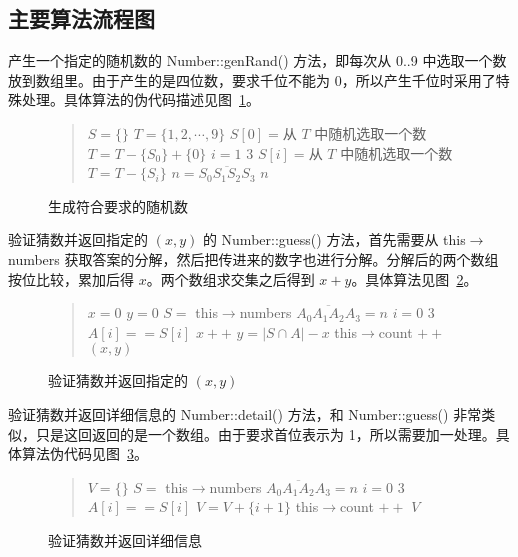 \subsection{主要算法流程图}

产生一个指定的随机数的 Number::genRand() 方法，即每次从 0..9 中选取一个数放到数组里。由于产生的是四位数，要求千位不能为 0，所以产生千位时采用了特殊处理。具体算法的伪代码描述见图~\ref{Number::genRand}。

\begin{figure}[htp]
\begin{quote}
\begin{codebox}
\li $S = \{\}$
\li $T = \{1, 2, \cdots, 9\}$
\li $S[0] = $从 $T$ 中随机选取一个数
\li $T = T - \{S_0\} + \{0\}$
\li \For $i = 1$ \To $3$ \Do
\li   $S[i] = $从 $T$ 中随机选取一个数
\li   $T = T - \{S_i\}$
	\End
\li $n = \overline{S_0S_1S_2S_3}$
\li \Return $n$
\end{codebox}
\end{quote}
\caption{\label{Number::genRand}生成符合要求的随机数}
\end{figure}

验证猜数并返回指定的 $(x, y)$ 的 Number::guess() 方法，首先需要从 this$\to$numbers 获取答案的分解，然后把传进来的数字也进行分解。分解后的两个数组按位比较，累加后得 $x$。两个数组求交集之后得到 $x + y$。具体算法见图~\ref{Number::guess}。

\begin{figure}[htp]
\begin{quote}
\begin{codebox}
\li $x = 0$
\li $y = 0$
\li $S = $ this$\to$numbers
\li $\overline{A_0A_1A_2A_3} = n$
\li \For $i = 0$ \To $3$ \Do
\li   \If $A[i] == S[i]$ \Then
\li     $x++$
      \End
    \End
\li $y = |S \cap A| - x$
\li this$\to$count $++$
\li \Return $(x, y)$
\end{codebox}
\end{quote}
\caption{\label{Number::guess}验证猜数并返回指定的 $(x, y)$}
\end{figure}

验证猜数并返回详细信息的 Number::detail() 方法，和 Number::guess() 非常类似，只是这回返回的是一个数组。由于要求首位表示为 1，所以需要加一处理。具体算法伪代码见图~\ref{Number::detail}。

\begin{figure}[htp]
\begin{quote}
\begin{codebox}
\li $V = \{\}$
\li $S = $ this$\to$numbers
\li $\overline{A_0A_1A_2A_3} = n$
\li \For $i = 0$ \To $3$ \Do
\li   \If $A[i] == S[i]$ \Then
\li     $V = V + \{i + 1\}$
      \End
    \End
\li this$\to$count $++$
\li \Return $V$
\end{codebox}
\end{quote}
\caption{\label{Number::detail}验证猜数并返回详细信息}
\end{figure}


